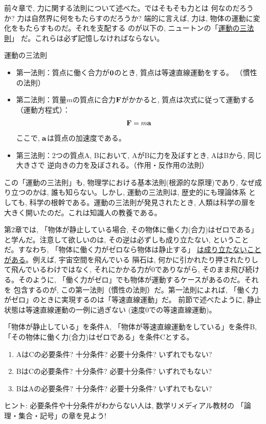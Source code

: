 前々章で, 力に関する法則について述べた。ではそもそも力とは
何なのだろうか? 力は自然界に何をもたらすのだろうか? 
端的に言えば, 力は, 物体の運動に変化をもたらすものだ。それを支配する
のが以下の, ニュートンの「\underline{運動の三法則}」
だ。これらは必ず記憶しなければならない。
\begin{itembox}{運動の三法則}
\begin{itemize}
\item 第一法則：質点に働く合力が${\bf 0}$のとき, 質点は等速直線運動をする。
（慣性の法則）
\item 第二法則：質量$m$の質点に合力${\bf F}$がかかると, 質点は次式に従って運動する
（運動方程式）：
\begin{eqnarray}
{\bf F}=m{\bf a}\label{eq:motion}
\end{eqnarray}
ここで, ${\bf a}$は質点の加速度である。
\item 第三法則：2つの質点A, Bにおいて, AがBに力を及ぼすとき, AはBから, 同じ大きさで
逆向きの力を及ぼされる。（作用・反作用の法則）
\end{itemize}
\end{itembox}

この「運動の三法則」も, 物理学における基本法則(根源的な原理)であり, 
なぜ成り立つのかは, 誰も知らない。しかし, 運動の三法則は, 歴史的にも理論体系
としても, 科学の根幹である。運動の三法則が発見されたとき, 人類は科学の扉を
大きく開いたのだ。これは知識人の教養である。\mv

第2章では, 「物体が静止している場合, その物体に働く力(合力)はゼロである」
と学んだ。注意して欲しいのは, その逆は必ずしも成り立たない, 
ということだ。すなわち, 「物体に働く力がゼロなら物体は静止する」
\underline{は成り立たないことがある}。例えば, 宇宙空間を飛んでいる
隕石は, 何かに引かれたり押されたりして飛んでいるわけではなく, 
それにかかる力が0でありながら, そのまま飛び続ける。そのように, 
「働く力がゼロ」でも物体が運動するケースがあるのだ。それを
包含するのが, この第一法則（慣性の法則）だ。第一法則によれば, 
「働く力がゼロ」のときに実現するのは「等速直線運動」だ。
前節で述べたように, 静止状態は等速直線運動の一例に過ぎない
(速度0での等速直線運動)。\mv

\begin{q}\label{q:motion1condition}「物体が静止している」を条件A, 
「物体が等速直線運動をしている」を条件B, 「その物体に働く力(合力)はゼロである」を条件Cとする。
\begin{enumerate}
\item AはCの必要条件? 十分条件? 必要十分条件? いずれでもない?
\item BはCの必要条件? 十分条件? 必要十分条件? いずれでもない?
\item BはAの必要条件? 十分条件? 必要十分条件? いずれでもない?
\end{enumerate}
{\small ヒント: 必要条件や十分条件がわからない人は, 数学リメディアル教材の
「論理・集合・記号」の章を見よう!}
\end{q}
\mv

